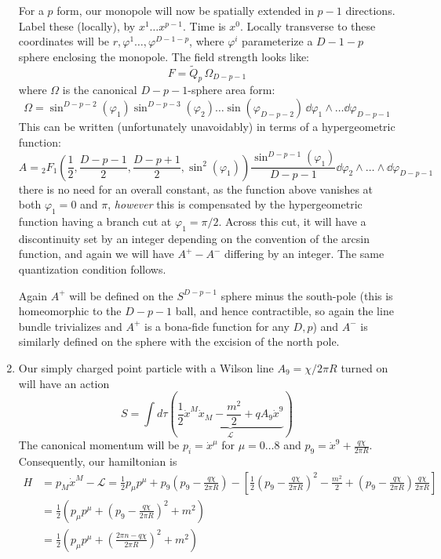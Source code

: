 \documentclass[11pt, class=article, crop=false]{standalone}
\begin{document}
\begin{enumerate}
	For a $p$ form, our monopole will now be spatially extended in $p-1$ directions. Label these (locally), by $x^1 \dots x^{p-1}$. Time is $x^0$. Locally transverse to these coordinates will be $r, \varphi^1 \dots, \varphi^{D-1-p}$, where $\varphi^i$ parameterize a $D-1-p$ sphere enclosing the monopole. The field strength looks like:
	\[
		F = \tilde Q_p \, \Omega_{D-p-1}
	\]
	where $\Omega$ is the canonical $D-p-1$-sphere area form:
	\[
		\Omega = \sin^{D-p-2}(\varphi_1) \sin^{D-p-3}(\varphi_2) \dots \sin(\varphi_{D-p-2})\, \dd \varphi_1 \wedge \dots \dd \varphi_{D-p-1}
	\]
	This can be written (unfortunately unavoidably) in terms of a hypergeometric function:
	\[
		A =  {_2 F_1}\left(\frac12, \frac{D-p-1}{2}, \frac{D-p+1}{2}, \sin^2(\varphi_1) \right) \frac{\sin^{D-p-1}(\varphi_1)}{D-p-1} \dd \varphi_2 \wedge \dots \wedge \dd \varphi_{D-p-1}
	\]
	there is no need for an overall constant, as the function above vanishes at both $\varphi_1 = 0$ and $\pi$, \emph{however} this is compensated by the hypergeometric function having a branch cut at $\varphi_1 = \pi/2$. Across this cut, it will have a discontinuity set by an integer depending on the convention of the arcsin function, and again we will have $A^+ - A^-$ differing by an integer.  The same quantization condition follows. 
	
	Again $A^+$ will be defined on the $S^{D-p-1}$ sphere minus the south-pole (this is homeomorphic to the $D-p-1$ ball, and hence contractible, so again the line bundle trivializes and $A^+$ is a bona-fide function for any $D, p$) and $A^-$ is similarly defined on the sphere with the excision of the north pole.
	
	\item Our simply charged point particle with a Wilson line $A_9 = \chi/2\pi R$ turned on will have an action
	\[
		S = \int d \tau \left( \underbrace{\frac12 \dot x^M \dot x_M - \frac{m^2}{2} + q A_9 \dot x^9}_{\mathcal L} \right)
	\]
	The canonical momentum will be $p_i = \dot x^\mu$ for $\mu = 0 \dots 8$ and $p_9 = \dot x^9 + \frac{q \chi}{2 \pi R}$. Consequently, our hamiltonian is
	\[
	\begin{aligned}
		H &= p_M \dot x^M - \mathcal L = \frac12 p_\mu p^\mu + p_9 (p_9 -  \frac{q \chi}{2 \pi R}) - \left[\frac12 (p_9 - \frac{q \chi}{2\pi R})^2 - \frac{m^2}{2} + (p_9 - \frac{q \chi}{2 \pi R}) \frac{q \chi}{2 \pi R}\right]\\
		&= \frac12 \left(p_\mu p^\mu + (p_9 - \frac{q \chi}{2\pi R})^2 + m^2\right)\\
		&= \frac12 \left(p_\mu p^\mu + \left(\frac{2 \pi n - q \chi}{2\pi R}\right)^2 + m^2\right)
	\end{aligned}
	\]
	

\end{enumerate}
\end{document}
